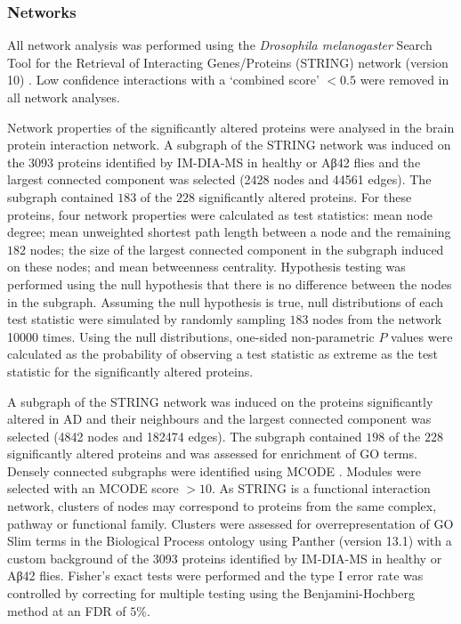 \subsubsection{Networks}
\label{sec:fly-networks-methods}

All network analysis was performed using the \textit{Drosophila melanogaster} Search Tool for the Retrieval of Interacting Genes/Proteins (STRING) network (version 10) \cite{Szklarczyk2015}.
Low confidence interactions with a `combined score' $< 0.5$ were removed in all network analyses.

Network properties of the significantly altered proteins were analysed in the brain protein interaction network.
A subgraph of the STRING network was induced on the \num{3093} proteins identified by IM-DIA-MS in healthy or Aβ42 flies and the largest connected component was selected (\num{2428} nodes and \num{44561} edges).
The subgraph contained $183$ of the $228$ significantly altered proteins.
For these proteins, four network properties were calculated as test statistics: mean node degree; mean unweighted shortest path length between a node and the remaining $182$ nodes; the size of the largest connected component in the subgraph induced on these nodes; and mean betweenness centrality.
Hypothesis testing was performed using the null hypothesis that there is no difference between the nodes in the subgraph.
Assuming the null hypothesis is true, null distributions of each test statistic were simulated by randomly sampling $183$ nodes from the network \num{10000} times.
Using the null distributions, one-sided non-parametric $P$ values were calculated as the probability of observing a test statistic as extreme as the test statistic for the significantly altered proteins.

A subgraph of the STRING network was induced on the proteins significantly altered in AD and their neighbours and the largest connected component was selected (\num{4842} nodes and \num{182474} edges).
The subgraph contained $198$ of the $228$ significantly altered proteins and was assessed for enrichment of GO terms. Densely connected subgraphs were identified using MCODE \cite{Bader2003}.
Modules were selected with an MCODE score $> 10$. As STRING is a functional interaction network, clusters of nodes may correspond to proteins from the same complex, pathway or functional family.
Clusters were assessed for overrepresentation of GO Slim terms in the Biological Process ontology using Panther \cite{Mi2013} (version 13.1) with a custom background of the \num{3093} proteins identified by IM-DIA-MS in healthy or Aβ42 flies.
Fisher’s exact tests were performed and the type I error rate was controlled by correcting for multiple testing using the Benjamini-Hochberg method at an FDR of $5\%$.

